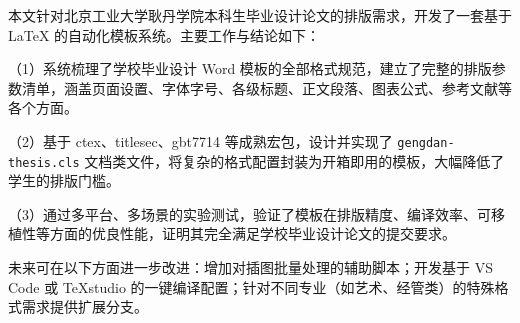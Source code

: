 本文针对北京工业大学耿丹学院本科生毕业设计论文的排版需求，开发了一套基于 \LaTeX{} 的自动化模板系统。主要工作与结论如下：

（1）系统梳理了学校毕业设计 Word 模板的全部格式规范，建立了完整的排版参数清单，涵盖页面设置、字体字号、各级标题、正文段落、图表公式、参考文献等各个方面。

（2）基于 ctex、titlesec、gbt7714 等成熟宏包，设计并实现了 \verb|gengdan-thesis.cls| 文档类文件，将复杂的格式配置封装为开箱即用的模板，大幅降低了学生的排版门槛。

（3）通过多平台、多场景的实验测试，验证了模板在排版精度、编译效率、可移植性等方面的优良性能，证明其完全满足学校毕业设计论文的提交要求。

未来可在以下方面进一步改进：增加对插图批量处理的辅助脚本；开发基于 VS Code 或 TeXstudio 的一键编译配置；针对不同专业（如艺术、经管类）的特殊格式需求提供扩展分支。
